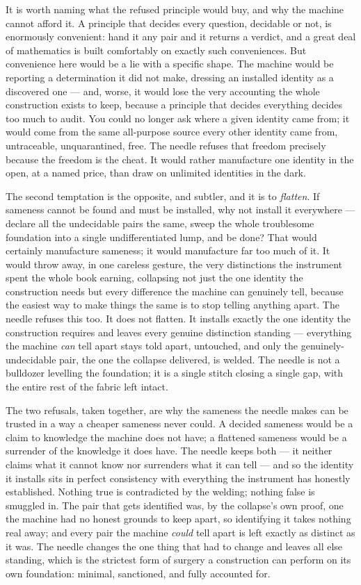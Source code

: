 It is worth naming what the refused principle would buy, and why the machine cannot afford it. A principle that
decides every question, decidable or not, is enormously convenient: hand it any pair and it returns a verdict,
and a great deal of mathematics is built comfortably on exactly such conveniences. But convenience here would be
a lie with a specific shape. The machine would be reporting a determination it did not make, dressing an
installed identity as a discovered one --- and, worse, it would lose the very accounting the whole construction
exists to keep, because a principle that decides everything decides too much to audit. You could no longer ask
where a given identity came from; it would come from the same all-purpose source every other identity came from,
untraceable, unquarantined, free. The needle refuses that freedom precisely because the freedom is the cheat. It
would rather manufacture one identity in the open, at a named price, than draw on unlimited identities in the
dark.

The second temptation is the opposite, and subtler, and it is to \emph{flatten}. If sameness cannot be found and
must be installed, why not install it everywhere --- declare all the undecidable pairs the same, sweep the whole
troublesome foundation into a single undifferentiated lump, and be done? That would certainly manufacture
sameness; it would manufacture far too much of it. It would throw away, in one careless gesture, the very
distinctions the instrument spent the whole book earning, collapsing not just the one identity the construction
needs but every difference the machine can genuinely tell, because the easiest way to make things the same is to
stop telling anything apart. The needle refuses this too. It does not flatten. It installs exactly the one
identity the construction requires and leaves every genuine distinction standing --- everything the machine
\emph{can} tell apart stays told apart, untouched, and only the genuinely-undecidable pair, the one the collapse
delivered, is welded. The needle is not a bulldozer levelling the foundation; it is a single stitch closing a
single gap, with the entire rest of the fabric left intact.

The two refusals, taken together, are why the sameness the needle makes can be trusted in a way a cheaper sameness
never could. A decided sameness would be a claim to knowledge the machine does not have; a flattened sameness
would be a surrender of the knowledge it does have. The needle keeps both --- it neither claims what it cannot
know nor surrenders what it can tell --- and so the identity it installs sits in perfect consistency with
everything the instrument has honestly established. Nothing true is contradicted by the welding; nothing false is
smuggled in. The pair that gets identified was, by the collapse's own proof, one the machine had no honest grounds
to keep apart, so identifying it takes nothing real away; and every pair the machine \emph{could} tell apart is
left exactly as distinct as it was. The needle changes the one thing that had to change and leaves all else
standing, which is the strictest form of surgery a construction can perform on its own foundation: minimal,
sanctioned, and fully accounted for.

